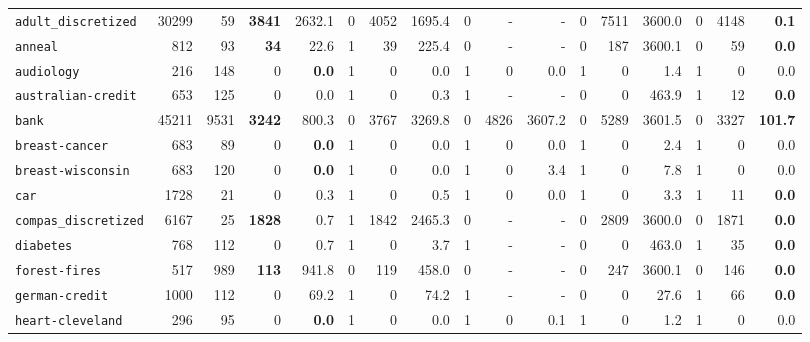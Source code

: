 \begin{tabular}{lccrrrrrrrrrrrrrr}
\texttt{adult\_discretized} & \multicolumn{1}{r}{30299} & \multicolumn{1}{r}{59}  & \textbf{3841} & 2632.1 & 0 & 4052 & 1695.4 & 0 & - & - & 0 & 7511 & 3600.0 & 0 & 4148 & \textbf{0.1}\\
\texttt{anneal} & \multicolumn{1}{r}{812} & \multicolumn{1}{r}{93}  & \textbf{34} & 22.6 & 1 & 39 & 225.4 & 0 & - & - & 0 & 187 & 3600.1 & 0 & 59 & \textbf{0.0}\\
\texttt{audiology} & \multicolumn{1}{r}{216} & \multicolumn{1}{r}{148}  & 0 & \textbf{0.0} & 1 & 0 & 0.0 & 1 & 0 & 0.0 & 1 & 0 & 1.4 & 1 & 0 & 0.0\\
\texttt{australian-credit} & \multicolumn{1}{r}{653} & \multicolumn{1}{r}{125}  & 0 & 0.0 & 1 & 0 & 0.3 & 1 & - & - & 0 & 0 & 463.9 & 1 & 12 & \textbf{0.0}\\
\texttt{bank} & \multicolumn{1}{r}{45211} & \multicolumn{1}{r}{9531}  & \textbf{3242} & 800.3 & 0 & 3767 & 3269.8 & 0 & 4826 & 3607.2 & 0 & 5289 & 3601.5 & 0 & 3327 & \textbf{101.7}\\
\texttt{breast-cancer} & \multicolumn{1}{r}{683} & \multicolumn{1}{r}{89}  & 0 & \textbf{0.0} & 1 & 0 & 0.0 & 1 & 0 & 0.0 & 1 & 0 & 2.4 & 1 & 0 & 0.0\\
\texttt{breast-wisconsin} & \multicolumn{1}{r}{683} & \multicolumn{1}{r}{120}  & 0 & \textbf{0.0} & 1 & 0 & 0.0 & 1 & 0 & 3.4 & 1 & 0 & 7.8 & 1 & 0 & 0.0\\
\texttt{car} & \multicolumn{1}{r}{1728} & \multicolumn{1}{r}{21}  & 0 & 0.3 & 1 & 0 & 0.5 & 1 & 0 & 0.0 & 1 & 0 & 3.3 & 1 & 11 & \textbf{0.0}\\
\texttt{compas\_discretized} & \multicolumn{1}{r}{6167} & \multicolumn{1}{r}{25}  & \textbf{1828} & 0.7 & 1 & 1842 & 2465.3 & 0 & - & - & 0 & 2809 & 3600.0 & 0 & 1871 & \textbf{0.0}\\
\texttt{diabetes} & \multicolumn{1}{r}{768} & \multicolumn{1}{r}{112}  & 0 & 0.7 & 1 & 0 & 3.7 & 1 & - & - & 0 & 0 & 463.0 & 1 & 35 & \textbf{0.0}\\
\texttt{forest-fires} & \multicolumn{1}{r}{517} & \multicolumn{1}{r}{989}  & \textbf{113} & 941.8 & 0 & 119 & 458.0 & 0 & - & - & 0 & 247 & 3600.1 & 0 & 146 & \textbf{0.0}\\
\texttt{german-credit} & \multicolumn{1}{r}{1000} & \multicolumn{1}{r}{112}  & 0 & 69.2 & 1 & 0 & 74.2 & 1 & - & - & 0 & 0 & 27.6 & 1 & 66 & \textbf{0.0}\\
\texttt{heart-cleveland} & \multicolumn{1}{r}{296} & \multicolumn{1}{r}{95}  & 0 & \textbf{0.0} & 1 & 0 & 0.0 & 1 & 0 & 0.1 & 1 & 0 & 1.2 & 1 & 0 & 0.0\\

\end{tabular}
